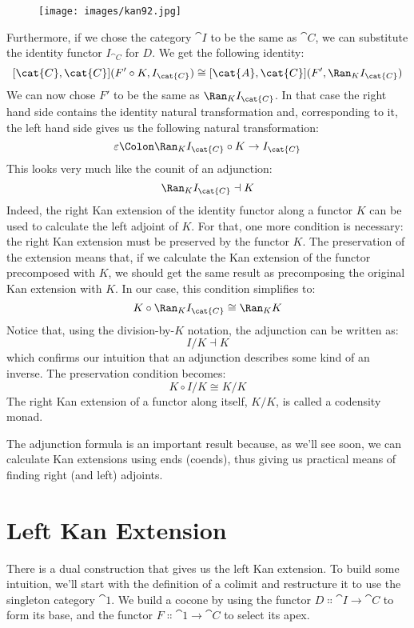 \begin{figure}[H]
  \centering
  \texttt{[image: images/kan92.jpg]}
\end{figure}

\noindent
Furthermore, if we chose the category $\cat{I}$ to be the same as
$\cat{C}$, we can substitute the identity functor $I_{\cat{C}}$ for
$D$. We get the following identity:
\[[\cat{C}, \cat{C}](F' \circ K, I_{\cat{C}}) \cong [\cat{A}, \cat{C}](F', \Ran_{K}I_{\cat{C}})\]
We can now chose $F'$ to be the same as $\Ran_{K}I_{\cat{C}}$. In
that case the right hand side contains the identity natural
transformation and, corresponding to it, the left hand side gives us the
following natural transformation:
\[\varepsilon \Colon \Ran_{K}I_{\cat{C}} \circ K \to I_{\cat{C}}\]
This looks very much like the counit of an adjunction:
\[\Ran_{K}I_{\cat{C}} \dashv K\]
Indeed, the right Kan extension of the identity functor along a functor
$K$ can be used to calculate the left adjoint of $K$. For
that, one more condition is necessary: the right Kan extension must be
preserved by the functor $K$. The preservation of the extension
means that, if we calculate the Kan extension of the functor precomposed
with $K$, we should get the same result as precomposing the
original Kan extension with $K$. In our case, this condition
simplifies to:
\[K \circ \Ran_{K}I_{\cat{C}} \cong \Ran_{K}K\]
Notice that, using the division-by-$K$ notation, the adjunction can be
written as:
\[I/K \dashv K\]
which confirms our intuition that an adjunction describes some kind of
an inverse. The preservation condition becomes:
\[K \circ I/K \cong K/K\]
The right Kan extension of a functor along itself, $K/K$, is
called a codensity monad.

The adjunction formula is an important result because, as we'll see
soon, we can calculate Kan extensions using ends (coends), thus giving
us practical means of finding right (and left) adjoints.

\section{Left Kan Extension}

There is a dual construction that gives us the left Kan extension. To
build some intuition, we'll start with the definition of a colimit
and restructure it to use the singleton category $\cat{1}$. We build a
cocone by using the functor $D \Colon \cat{I} \to \cat{C}$ to form its
base, and the functor $F \Colon \cat{1} \to \cat{C}$ to select its apex.

